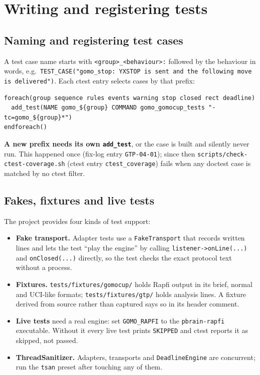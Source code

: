 \documentclass[11pt,a4paper]{article}
\newcommand{\code}[1]{\texttt{#1}}
\newcommand{\file}[1]{\texttt{#1}}
\begin{document}
\section{Writing and registering tests}\label{sec:testing}

\subsection{Naming and registering test cases}

A test case name starts with \code{<group>\_<behaviour>:} followed by the behaviour in words, e.g.\
\code{TEST\_CASE("gomo\_stop: YXSTOP is sent and the following move is delivered")}. Each ctest entry
selects cases by that prefix:

\begin{lstlisting}[style=sh]
foreach(group sequence rules events warning stop closed rect deadline)
  add_test(NAME gomo_${group} COMMAND gomo_gomocup_tests "-tc=gomo_${group}*")
endforeach()
\end{lstlisting}

\noindent \textbf{A new prefix needs its own \code{add\_test}}, or the case is built and silently never
run. This happened once (fix-log entry \code{GTP-04-01}); since then
\file{scripts/check-ctest-coverage.sh} (ctest entry \code{ctest\_coverage}) fails when any doctest
case is matched by no ctest filter.

\subsection{Fakes, fixtures and live tests}

The project provides four kinds of test support:

\begin{itemize}
  \item \textbf{Fake transport.} Adapter tests use a \code{FakeTransport} that records written lines
        and lets the test ``play the engine'' by calling \code{listener->onLine(...)} and
        \code{onClosed(...)} directly, so the test checks the exact protocol text without a
        process.
  \item \textbf{Fixtures.} \file{tests/fixtures/gomocup/} holds Rapfi output in its brief, normal and
        UCI-like formats; \file{tests/fixtures/gtp/} holds analysis lines. A fixture derived from
        source rather than captured says so in its header comment.
  \item \textbf{Live tests} need a real engine: set \code{GOMO\_RAPFI} to the
        \code{pbrain-rapfi} executable. Without it every live test prints \code{SKIPPED} and
        ctest reports it as skipped, not passed.
  \item \textbf{ThreadSanitizer.} Adapters, transports and \code{DeadlineEngine} are concurrent; run
        the \code{tsan} preset after touching any of them.
\end{itemize}
\end{document}
